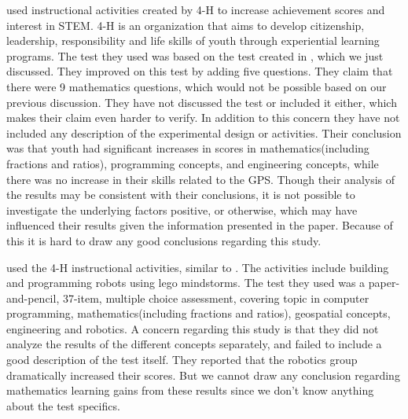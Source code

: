 \bigskip\noindent
{} used instructional activities created by 4-H to increase achievement scores and interest in STEM. 4-H is an organization that aims to develop citizenship, leadership, responsibility and life skills of youth through experiential learning programs. The test they used was based on the test created in \cite{barker2007robotics}, which we just discussed. They improved on this test by adding five questions. They claim that there were 9 mathematics questions, which would not be possible based on our previous discussion. They have not discussed the test or included it either, which makes their claim even harder to verify. 
In addition to this concern they have not included any description of the experimental design or activities. 
Their conclusion was that youth had significant increases in scores in mathematics(including fractions and ratios), programming concepts, and engineering concepts, while there was no increase in their skills related to the GPS. 
Though their analysis of the results may be consistent with their conclusions, it is not possible to investigate the underlying factors positive, or otherwise, which may have influenced their results given the information presented in the paper.
Because of this it is hard to draw any good conclusions regarding this study.\cite{nugent2008effect}

\bigskip\noindent
{} used the 4-H instructional activities, similar to . The activities include building and programming robots using lego mindstorms. The test they used was a paper-and-pencil, 37-item, multiple choice assessment, covering topic in computer programming, mathematics(including fractions and ratios), geospatial concepts, engineering and robotics. 
A concern regarding this study is that they did not analyze the results of the different concepts separately, and failed to include a good description of the test itself. 
They reported that the robotics group dramatically increased their scores. But we cannot draw any conclusion regarding mathematics learning gains from these results since we don't know anything about the test specifics.\cite{nugent2009use}

